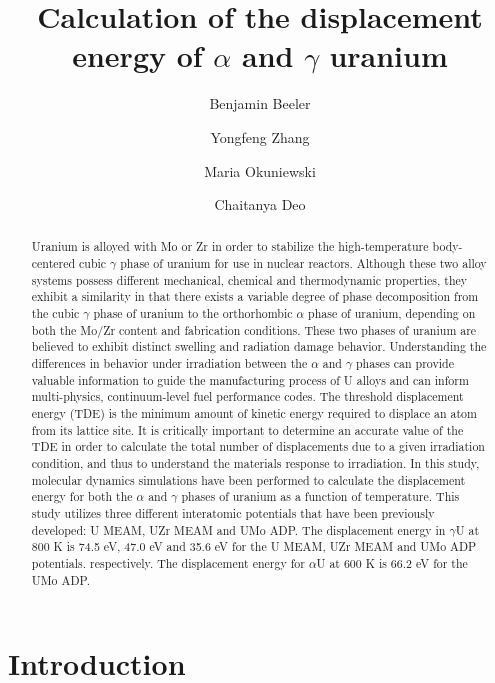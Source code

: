 \documentclass[review]{elsarticle}
\begin{document}
\begin{frontmatter}
\title{Calculation of the displacement energy of $\alpha$ and $\gamma$ uranium}

\author[inl]{Benjamin Beeler}
\author[inl]{Yongfeng Zhang}
\author[pur]{Maria Okuniewski}
\author[gatech]{Chaitanya Deo}
\address[inl]{Idaho National Laboratory, Idaho Falls, ID 83415}
\address[pur]{Purdue University, West Lafayette, IN 47907}
\address[gatech]{Georgia Institute of Technology, Atlanta, GA 30332}

\begin{abstract}

Uranium is alloyed with Mo or Zr in order to stabilize the high-temperature body-centered cubic $\gamma$ phase of uranium for use in nuclear reactors. Although these two alloy systems possess different mechanical, chemical and thermodynamic properties, they exhibit a similarity in that there exists a variable degree of phase decomposition from the cubic $\gamma$ phase of uranium to the orthorhombic $\alpha$ phase of uranium, depending on both the Mo/Zr content and fabrication conditions. These two phases of uranium are believed to exhibit distinct swelling and radiation damage behavior. Understanding the differences in behavior under irradiation between the $\alpha$ and $\gamma$ phases can provide valuable information to guide the manufacturing process of U alloys and can inform multi-physics, continuum-level fuel performance codes. The threshold displacement energy (TDE) is the minimum amount of kinetic energy required to displace an atom from its lattice site. It is critically important to determine an accurate value of the TDE in order to calculate the total number of displacements due to a given irradiation condition, and thus to understand the materials response to irradiation. In this study, molecular dynamics simulations have been performed to calculate the displacement energy for both the $\alpha$ and $\gamma$ phases of uranium as a function of temperature. This study utilizes three different interatomic potentials that have been previously developed: U MEAM, UZr MEAM and UMo ADP. The displacement energy in $\gamma$U at 800 K is 74.5 eV, 47.0 eV and 35.6 eV for the U MEAM, UZr MEAM and UMo ADP potentials. respectively. The displacement energy for $\alpha$U at 600 K is 66.2 eV for the UMo ADP. 
\end{abstract}
\end{frontmatter}

\section{Introduction}
\end{document}

